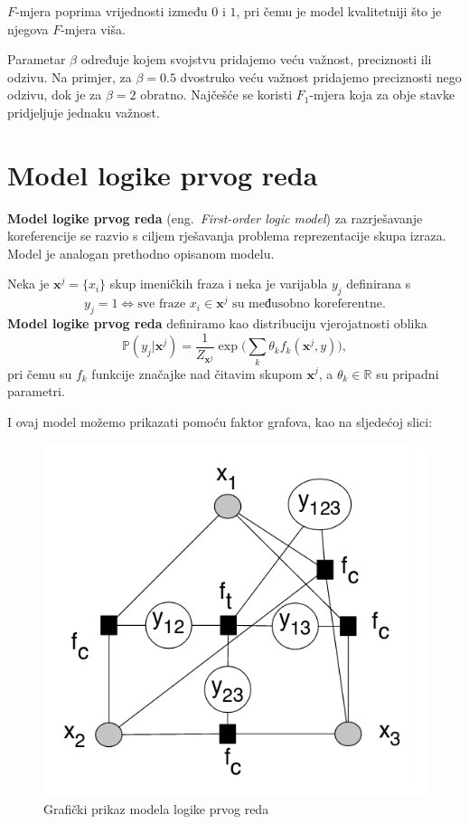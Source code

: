 \documentclass[a4paper,twoside,12pt]{memoir} %
\newcommand{\ti}[1]{\textit{#1\/}}
\newcommand{\tb}{\textbf}
\begin{document}
	$F$-mjera poprima vrijednosti između $0$ i $1$, pri čemu je model kvalitetniji što je njegova $F$-mjera viša.

	Parametar $\beta$ određuje kojem svojstvu pridajemo veću važnost, preciznosti ili odzivu. Na primjer, za $\beta = 0.5$ dvostruko veću važnost pridajemo preciznosti nego odzivu, dok je za $\beta = 2$ obratno. Najčešće se koristi $F_1$-mjera koja za obje stavke pridjeljuje jednaku važnost.

	\section{Model logike prvog reda}

	\tb{Model logike prvog reda} (eng.~\ti{First-order logic model}) za razrješavanje koreferencije se razvio s ciljem rješavanja problema reprezentacije skupa izraza. Model je analogan prethodno opisanom modelu.

	\begin{defn}
		Neka je $\mathbf{x}^j = \{x_i\}$ skup imeničkih fraza i neka je varijabla $y_j$ definirana s
		\begin{equation*}
		y_j = 1 \iff \text{sve fraze } x_i \in \mathbf{x}^j  \text{ su međusobno koreferentne}.
		\end{equation*}
		\tb{Model logike prvog reda} definiramo kao distribuciju vjerojatnosti oblika
		\begin{equation}\label{first_order}
		\mathbb{P} (y_{j} | \mathbf{x}^j) =
		\frac {1} {Z_{\mathbf{x}^j}} \exp \bigg(\sum\limits_{k} \theta_k f_k(\mathbf{x}^j, y)\bigg),
		\end{equation}
		pri čemu su $f_k$ funkcije značajke nad čitavim skupom $\mathbf{x}^j$, a $\theta_k \in \mathbb{R}$ su pripadni parametri.
	\end{defn}

	I ovaj model možemo prikazati pomoću faktor grafova, kao na sljedećoj slici:
	\begin{figure}[H]
		\centering
		\includegraphics[scale = 0.5]{first_order_logic_factor_graph.png}
		\caption{Grafički prikaz modela logike prvog reda}
	\end{figure}
\end{document}
